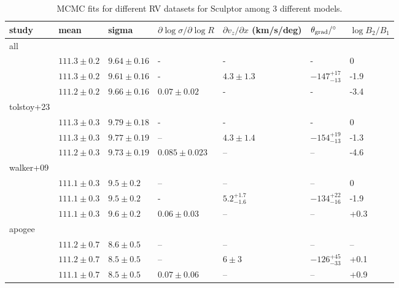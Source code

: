 \begin{landscape}
\begin{table*}[t]
\centering
\caption[Sculptor RV fits]{MCMC fits for different RV datasets for Sculptor among 3 different models. }
\label{tbl:scl_rv_mcmc}
\begin{tabular}{lllllll}
\toprule
study & mean & sigma & $\partial \log\sigma / \partial \log R$ & $\partial v_z / \partial x$ (km/s/deg) & $\theta_{\rm grad} / ^{\circ}$ & $\log B_2/B_1$\\
\midrule
all &  &  &  &  &  & \\
 & $111.3\pm0.2$ & $9.64\pm0.16$ & - & - & - & 0\\
 & $111.3 \pm 0.2$ & $9.61 \pm0.16$ & - & $4.3\pm1.3$ & $-147_{-13}^{+17}$ & -1.9\\
 & $111.2\pm0.2$ & $9.66\pm0.16$ & $0.07\pm0.02$ & - & - & -3.4\\
tolstoy+23 &  &  &  &  &  & \\
 & $111.3 \pm 0.3$ & $9.79 \pm 0.18$ & - & - & - & 0\\
 & $111.3\pm0.3$ & $9.77\pm0.19$ & – & $4.3\pm1.4$ & $-154_{-13}^{+19}$ & -1.3\\
 & $111.2 \pm 0.3$ & $9.73\pm0.19$ & $0.085 \pm 0.023$ & – & – & -4.6\\
walker+09 &  &  &  &  &  & \\
 & $111.1\pm0.3$ & $9.5\pm0.2$ & – & – & – & 0\\
 & $111.1\pm0.3$ & $9.5\pm0.2$ & - & $5.2_{-1.6}^{+1.7}$ & $-134_{-16}^{+22}$ & -1.9\\
 & $111.1\pm0.3$ & $9.6\pm0.2$ & $0.06\pm0.03$ & – & – & +0.3\\
apogee &  &  &  &  &  & \\
 & $111.2\pm0.7$ & $8.6\pm0.5$ & – & – & – & –\\
 & $111.2\pm0.7$ & $8.5\pm0.5$ & – & $6\pm3$ & $-126_{-33}^{+45}$ & +0.1\\
 & $111.1\pm0.7$ & $8.5\pm0.5$ & $0.07\pm0.06$ & – & – & +0.9\\
\bottomrule
\end{tabular}
\end{table*}

\end{landscape}
